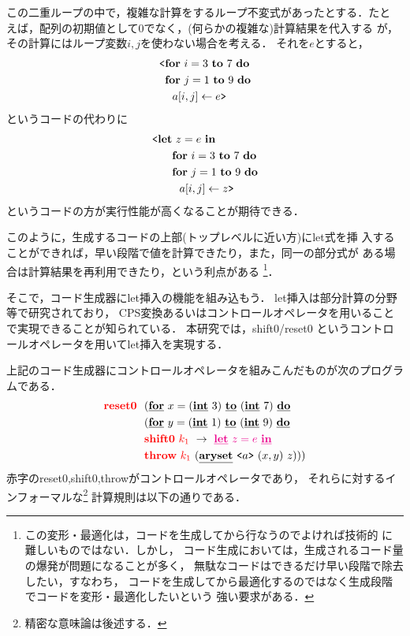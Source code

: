この二重ループの中で，複雑な計算をするループ不変式があったとする．たと
えば，配列の初期値として$0$でなく，(何らかの複雑な)計算結果を代入する
が，その計算にはループ変数$i,j$を使わない場合を考える．
それを$e$とすると，
\begin{align*}
  & \codebegin \forin{i=3}{7} \\
  & \phantom{\codebegin} \forin{j=1}{9} \\
  & \phantom{\codebegin} ~~\aryset{a}{i,j}{e} \codeend
\end{align*}
というコードの代わりに
\begin{align*}
  & \codebegin \Let~z=e~\In \\
  & \phantom{\codebegin \Let} \forin{i=3}{7} \\
  & \phantom{\codebegin \Let} \forin{j=1}{9} \\
  & \phantom{\codebegin \Let} ~~\aryset{a}{i,j}{z} \codeend
\end{align*}
というコードの方が実行性能が高くなることが期待できる．

このように，生成するコードの上部(トップレベルに近い方)にlet式を挿
入することができれば，早い段階で値を計算できたり，また，同一の部分式が
ある場合は計算結果を再利用できたり，という利点がある%
\footnote{この変形・最適化は，コードを生成してから行なうのでよければ技術的
  に難しいものではない．しかし，
  コード生成においては，生成されるコード量の爆発が問題になることが多く，
  無駄なコードはできるだけ早い段階で除去したい，すなわち，
  コードを生成してから最適化するのではなく生成段階でコードを変形・最適化したいという
  強い要求がある．}．

そこで，コード生成器にlet挿入の機能を組み込もう．
let挿入は部分計算の分野等で研究されており，
CPS変換あるいはコントロールオペレータを用いることで実現できることが知られている．
本研究では，shift0/reset0 というコントロールオペレータを用いてlet挿入を実現する．

上記のコード生成器にコントロールオペレータを組みこんだものが次のプログラムである．
\begin{align*}
  &\red{\Resetz} ~~(\cforin{x=(\cint~3)}{(\cint~7)} \\
  &\phantom{\Resetz} ~~(\cforin{y=(\cint~1)}{(\cint~9)} \\
  &\phantom{\Resetz} ~~\red{\Shiftz}~\red{k_1}~\to~ \magenta{\cLet~z=e~\cIn} \\
  &\phantom{\Resetz} ~~\red{\Throw}~\red{k_1}~(\caryset{\code{a}}{(x,y)}{z})))
\end{align*}
赤字のreset0,shift0,throwがコントロールオペレータであり，
それらに対するインフォーマルな\footnote{精密な意味論は後述する．}%
計算規則は以下の通りである．

